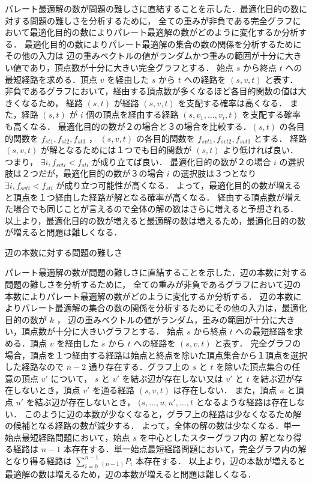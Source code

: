 \documentclass[12pt]{optlab-bachelor}
\begin{document}
パレート最適解の数が問題の難しさに直結することを示した．最適化目的の数に対する問題の難しさを分析するために，
全ての重みが非負である完全グラフにおいて最適化目的の数によりパレート最適解の数がどのように変化するか分析する．
最適化目的の数によりパレート最適解の集合の数の関係を分析するためにその他の入力は
辺の重みベクトルの値がランダムかつ重みの範囲が十分に大きい値であり，頂点数が十分に大きい完全グラフとする．
始点 $s$ から終点 $t$ への最短経路を求める．頂点 $v$ を経由した $s$ から $t$ への経路を $(s,v,t)$ と表す．
非負であるグラフにおいて，経由する頂点数が多くなるほど各目的関数の値は大きくなるため，
経路 $(s,t)$ が経路 $(s,v,t)$ を支配する確率は高くなる．
また，経路 $(s,t)$ が $i$ 個の頂点を経由する経路 $(s,v_1,\ldots,v_i,t)$ を支配する確率も高くなる．
最適化目的の数が２の場合と３の場合を比較する．$(s,t)$ の各目的関数を $f_{st1},f_{st2},f_{st3}$ ，
$(s,v,t)$ の各目的関数を $f_{svt1},f_{svt2},f_{svt3}$ とする．
経路 $(s,v,t)$ が解となるためには１つでも目的関数が $(s,t)$ より低ければ良い．
つまり， $\exists i ,f_{svti}<f_{sti}$ が成り立てば良い．
最適化目的の数が２の場合 $i$ の選択肢は２つだが，最適化目的の数が３の場合 $i$ の選択肢は３つとなり
 $\exists i ,f_{svti}<f_{sti}$ が成り立つ可能性が高くなる．
よって，最適化目的の数が増えると頂点を１つ経由した経路が解となる確率が高くなる．
経由する頂点数が増えた場合でも同じことが言えるので全体の解の数はさらに増えると予想される．
以上より，最適化目的の数が増えると最適解の数は増えるため，最適化目的の数が増えると問題は難しくなる．

\begin{description}
  \item[辺の本数に対する問題の難しさ]
\end{description}

パレート最適解の数が問題の難しさに直結することを示した．辺の本数に対する問題の難しさを分析するために，
全ての重みが非負であるグラフにおいて辺の本数によりパレート最適解の数がどのように変化するか分析する．
辺の本数によりパレート最適解の集合の数の関係を分析するためにその他の入力は，最適化目的の数が $k$ ，
辺の重みベクトルの値がランダム，重みの範囲が十分に大きい，頂点数が十分に大きいグラフとする．
始点 $s$ から終点 $t$ への最短経路を求める．頂点 $v$ を経由した $s$ から $t$ への経路を $(s,v,t)$ と表す．
完全グラフの場合，頂点を１つ経由する経路は始点と終点を除いた頂点集合から１頂点を選択した経路なので
 $n-2$ 通り存在する．グラフ上の $s$ と $t$ を除いた頂点集合の任意の頂点 $v'$ について， $s$ と $v'$
を結ぶ辺が存在しない又は $v'$ と $t$ を結ぶ辺が存在しないとき，頂点 $v'$ を通る経路 $(s,v,t)$ は存在しない．
また，頂点 $u$ と頂点 $u'$ を結ぶ辺が存在しないとき， $(s,\ldots, u, u', \ldots , t$ となるような経路は存在しない．
このように辺の本数が少なくなると，グラフ上の経路は少なくなるため解の候補となる経路の数が減少する．
よって，全体の解の数は少なくなる．単一始点最短経路問題において，始点 $s$ を中心としたスターグラフ内の
解となり得る経路は $n-1$ 本存在する．単一始点最短経路問題において，完全グラフ内の解となり得る経路は
 $\displaystyle \sum_{i=0}^{n-1} {}_{(n-1)}P_i$ 本存在する．
以上より，辺の本数が増えると最適解の数は増えるため，辺の本数が増えると問題は難しくなる．
\end{document}
